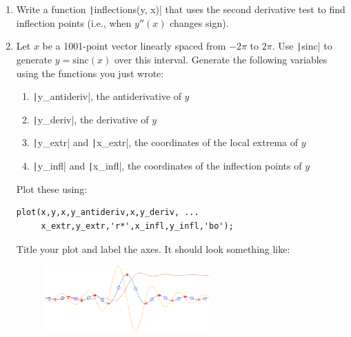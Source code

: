 \documentclass{article}
\begin{document}
\begin{enumerate}
\begin{enumerate}
  \item Write a function \texttt|inflections(y, x)| that uses the second derivative test to find inflection points (i.e., when $y''(x)$ changes sign).
    
  \item Let $x$ be a 1001-point vector linearly spaced from $-2\pi$ to $2\pi$. Use \texttt|sinc| to generate $y=\text{sinc}(x)$ over this interval. Generate the following variables using the functions you just wrote:
    \begin{enumerate}
    \item \texttt|y_antideriv|, the antiderivative of $y$
    \item \texttt|y_deriv|, the derivative of $y$
    \item \texttt|y_extr| and \texttt|x_extr|, the coordinates of the local extrema of $y$
    \item \texttt|y_infl| and \texttt|x_infl|, the coordinates of the inflection points of $y$
    \end{enumerate}
    Plot these using: \begin{verbatim}
plot(x,y,x,y_antideriv,x,y_deriv, ...
     x_extr,y_extr,'r*',x_infl,y_infl,'bo');
\end{verbatim}
    Title your plot and label the axes. It should look something like:
    \begin{figure}[!h]
      \centering
      \includegraphics[width=2.5in]{result.png}
    \end{figure}
  \end{enumerate}
\end{enumerate}
\end{document}
